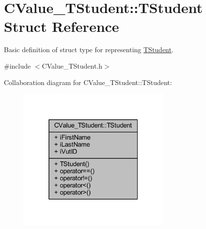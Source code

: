 \hypertarget{struct_c_value___t_student_1_1_t_student}{}\section{C\+Value\+\_\+\+T\+Student\+:\+:T\+Student Struct Reference}
\label{struct_c_value___t_student_1_1_t_student}


Basic definition of struct type for representing \hyperlink{struct_c_value___t_student_1_1_t_student}{T\+Student}.  




{\ttfamily \#include $<$C\+Value\+\_\+\+T\+Student.\+h$>$}



Collaboration diagram for C\+Value\+\_\+\+T\+Student\+:\+:T\+Student\+:\nopagebreak
\begin{figure}[H]
\begin{center}
\leavevmode
\includegraphics[width=217pt]{struct_c_value___t_student_1_1_t_student__coll__graph}
\end{center}
\end{figure}
